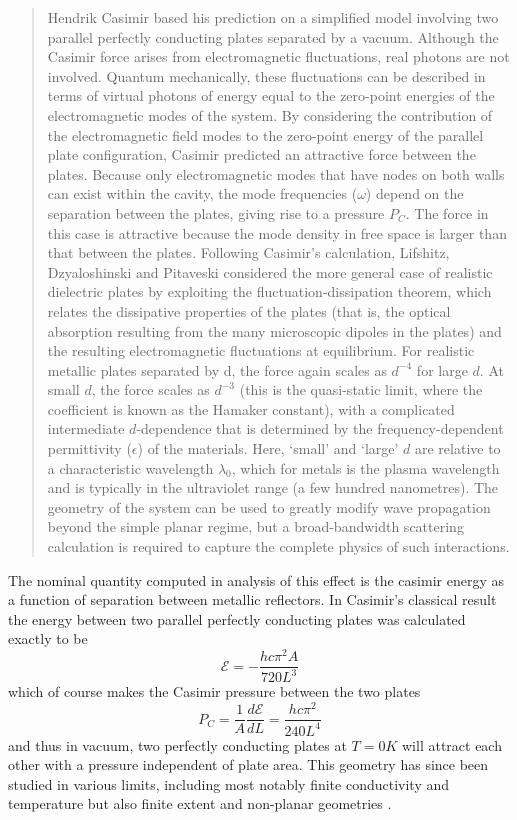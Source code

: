\documentclass[11pt,traditabstract]{article}
\newcommand{\E}{\mathcal{E}}
\begin{document}
\begin{quote}
Hendrik Casimir based his prediction on a simplified model involving two parallel perfectly conducting plates separated by a vacuum. Although the Casimir force arises from electromagnetic fluctuations, real photons are not involved. Quantum mechanically, these fluctuations can be described in terms of virtual photons of energy equal to the zero-point energies of the electromagnetic modes of the system. By considering the contribution of the electromagnetic field modes to the zero-point energy of the parallel plate configuration, Casimir predicted an attractive force between the plates. Because only electromagnetic modes that have nodes on both walls can exist within the cavity, the mode frequencies ($\omega$) depend on the separation between the plates, giving rise to a pressure $P_C$. The force in this case is attractive because the mode density in free space is larger than that between the plates. Following Casimir's calculation, Lifshitz, Dzyaloshinski and Pitaveski considered the more general case of realistic dielectric plates by exploiting the fluctuation-dissipation theorem, which relates the dissipative properties of the plates (that is, the optical absorption resulting from the many microscopic dipoles in the plates) and the resulting electromagnetic fluctuations at equilibrium. For realistic metallic plates separated by d, the force again scales as $d^{-4}$ for large $d.$ At small $d$, the force scales as $d^{-3}$ (this is the quasi-static limit, where the coefficient is known as the Hamaker constant), with a complicated intermediate $d$-dependence that is determined by the frequency-dependent permittivity ($\epsilon$) of the materials. Here, `small' and `large' $d$ are relative to a characteristic wavelength $\lambda_0$, which for metals is the plasma wavelength and is typically in the ultraviolet range (a few hundred nanometres). The geometry of the system can be used to greatly modify wave propagation beyond the simple planar regime, but a broad-bandwidth scattering calculation is required to capture the complete physics of such interactions.
\end{quote}

The nominal quantity computed in analysis of this effect is the casimir energy as a function of separation between metallic reflectors. In Casimir's classical result \citep{Casimir} the energy between two parallel perfectly conducting plates was calculated exactly to be \citep[given in nice form by][]{ScatteringTheory}
$$
\E=-\frac{hc\pi^2A}{720L^3}
$$
which of course makes the Casimir pressure between the two plates
$$
P_C=\frac{1}{A}\frac{d\E}{dL}=\frac{hc\pi^2}{240L^4}
$$
and thus in vacuum, two perfectly conducting plates at $T=0K$ will attract each other with a pressure independent of plate area. This geometry has since been studied in various limits, including most notably finite conductivity and temperature \citep[][ and references therein]{ScatteringTheory} but also finite extent and non-planar geometries \citep[][ and references therein]{Rahi}.
\end{document}
